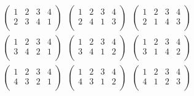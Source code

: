 \documentclass[]{article}
\begin{document}
\begin{equation}
\begin{aligned}\\
        \left(
        \begin{array}{cccc}
        1&2&3&4\\
        2&3&4&1\\
        \end{array}
        \right)
        \;\;
        \left(
        \begin{array}{cccc}
        1&2&3&4\\
        2&4&1&3\\
        \end{array}
        \right)
        \;\;
        \left(
        \begin{array}{cccc}
        1&2&3&4\\
        2&1&4&3\\
        \end{array}
        \right)
        \;\;\\
        \left(
        \begin{array}{cccc}
        1&2&3&4\\
        3&4&2&1\\
        \end{array}
        \right)
        \;\;
        \left(
        \begin{array}{cccc}
        1&2&3&4\\
        3&4&1&2\\
        \end{array}
        \right)
        \;\;
        \left(
        \begin{array}{cccc}
        1&2&3&4\\
        3&1&4&2\\
        \end{array}
        \right)
        \;\;\\
        \left(
        \begin{array}{cccc}
        1&2&3&4\\
        4&3&2&1\\
        \end{array}
        \right)
        \;\;
        \left(
        \begin{array}{cccc}
        1&2&3&4\\
        4&3&1&2\\
        \end{array}
        \right)
        \;\;
        \left(
        \begin{array}{cccc}
        1&2&3&4\\
        4&1&2&3\\
        \end{array}
        \right)
        \;\;\\\end{aligned}
\end{equation}
\end{document}
